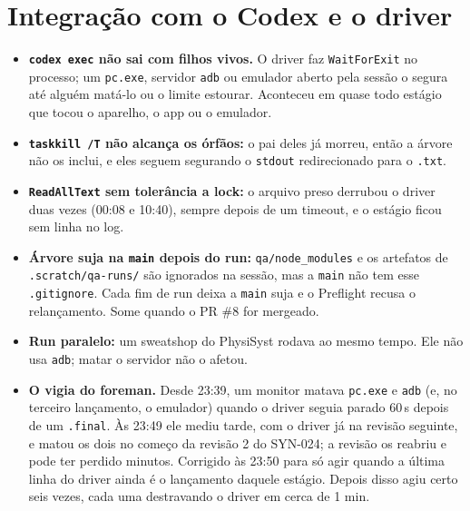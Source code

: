 \documentclass[11pt,a4paper]{article}
\begin{document}
\section{Integração com o Codex e o driver}
\begin{itemize}
  \item \textbf{\texttt{codex exec} não sai com filhos vivos.} O driver faz
        \texttt{WaitForExit} no processo; um \texttt{pc.exe}, servidor
        \texttt{adb} ou emulador aberto pela sessão o segura até alguém matá-lo
        ou o limite estourar. Aconteceu em quase todo estágio que tocou o
        aparelho, o app ou o emulador.
  \item \textbf{\texttt{taskkill /T} não alcança os órfãos:} o pai deles já
        morreu, então a árvore não os inclui, e eles seguem segurando o
        \texttt{stdout} redirecionado para o \texttt{.txt}.
  \item \textbf{\texttt{ReadAllText} sem tolerância a lock:} o arquivo preso
        derrubou o driver duas vezes (00:08 e 10:40), sempre depois de um
        timeout, e o estágio ficou sem linha no log.
  \item \textbf{Árvore suja na \texttt{main} depois do run:}
        \texttt{qa/node\_modules} e os artefatos de \texttt{.scratch/qa-runs/}
        são ignorados na sessão, mas a \texttt{main} não tem esse
        \texttt{.gitignore}. Cada fim de run deixa a \texttt{main} suja e o
        Preflight recusa o relançamento. Some quando o PR \#8 for mergeado.
  \item \textbf{Run paralelo:} um sweatshop do PhysiSyst rodava ao mesmo
        tempo. Ele não usa \texttt{adb}; matar o servidor não o afetou.
  \item \textbf{O vigia do foreman.} Desde 23:39, um monitor matava
        \texttt{pc.exe} e \texttt{adb} (e, no terceiro lançamento, o emulador)
        quando o driver seguia parado 60\,s depois de um \texttt{.final}. Às
        23:49 ele mediu tarde, com o driver já na revisão seguinte, e matou os
        dois no começo da revisão 2 do SYN-024; a revisão os reabriu e pode ter
        perdido minutos. Corrigido às 23:50 para só agir quando a última linha
        do driver ainda é o lançamento daquele estágio. Depois disso agiu certo
        seis vezes, cada uma destravando o driver em cerca de 1 min.
\end{itemize}
\end{document}

